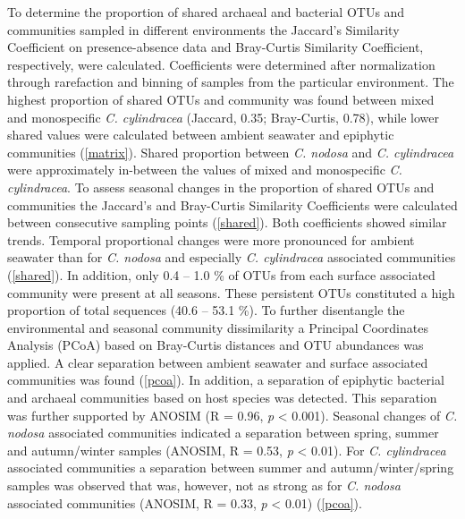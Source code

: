 \documentclass[12pt,]{article}
\begin{document}
To determine the proportion of shared archaeal and bacterial OTUs and
communities sampled in different environments the Jaccard's Similarity
Coefficient on presence-absence data and Bray-Curtis Similarity
Coefficient, respectively, were calculated. Coefficients were determined
after normalization through rarefaction and binning of samples from the
particular environment. The highest proportion of shared OTUs and
community was found between mixed and monospecific \emph{C. cylindracea}
(Jaccard, 0.35; Bray-Curtis, 0.78), while lower shared values were
calculated between ambient seawater and epiphytic communities
(\autoref{matrix}). Shared proportion between \emph{C. nodosa} and
\emph{C. cylindracea} were approximately in-between the values of mixed
and monospecific \emph{C. cylindracea}. To assess seasonal changes in
the proportion of shared OTUs and communities the Jaccard's and
Bray-Curtis Similarity Coefficients were calculated between consecutive
sampling points (\autoref{shared}). Both coefficients showed similar
trends. Temporal proportional changes were more pronounced for ambient
seawater than for \emph{C. nodosa} and especially \emph{C. cylindracea}
associated communities (\autoref{shared}). In addition, only 0.4 -- 1.0
\si{\percent} of OTUs from each surface associated community were
present at all seasons. These persistent OTUs constituted a high
proportion of total sequences (40.6 -- 53.1 \si{\percent}). To further
disentangle the environmental and seasonal community dissimilarity a
Principal Coordinates Analysis (PCoA) based on Bray-Curtis distances and
OTU abundances was applied. A clear separation between ambient seawater
and surface associated communities was found (\autoref{pcoa}). In
addition, a separation of epiphytic bacterial and archaeal communities
based on host species was detected. This separation was further
supported by ANOSIM (R = 0.96, \emph{p} \textless{} 0.001). Seasonal
changes of \emph{C. nodosa} associated communities indicated a
separation between spring, summer and autumn/winter samples (ANOSIM, R =
0.53, \emph{p} \textless{} 0.01). For \emph{C. cylindracea} associated
communities a separation between summer and autumn/winter/spring samples
was observed that was, however, not as strong as for \emph{C. nodosa}
associated communities (ANOSIM, R = 0.33, \emph{p} \textless{} 0.01)
(\autoref{pcoa}).
\end{document}
